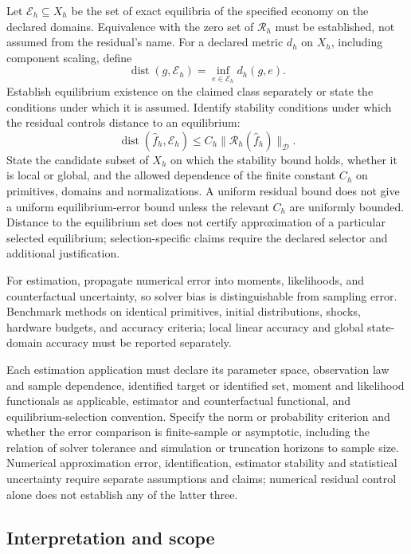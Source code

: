 \documentclass[11pt,a4paper]{article}
\begin{document}
Let $\mathcal E_h\subseteq X_h$ be the set of exact equilibria of the specified economy on the declared domains. Equivalence with the zero set of $\mathcal R_h$ must be established, not assumed from the residual's name. For a declared metric $d_h$ on $X_h$, including component scaling, define
\[
\operatorname{dist}(g,\mathcal E_h)=\inf_{e\in\mathcal E_h}d_h(g,e).
\]
Establish equilibrium existence on the claimed class separately or state the conditions under which it is assumed. Identify stability conditions under which the residual controls distance to an equilibrium:
\[
\operatorname{dist}(\hat f_h,\mathcal E_h)\le C_h\|\mathcal R_h(\hat f_h)\|_{\mathcal D}.
\]
State the candidate subset of $X_h$ on which the stability bound holds, whether it is local or global, and the allowed dependence of the finite constant $C_h$ on primitives, domains and normalizations. A uniform residual bound does not give a uniform equilibrium-error bound unless the relevant $C_h$ are uniformly bounded. Distance to the equilibrium set does not certify approximation of a particular selected equilibrium; selection-specific claims require the declared selector and additional justification.

For estimation, propagate numerical error into moments, likelihoods, and counterfactual uncertainty, so solver bias is distinguishable from sampling error. Benchmark methods on identical primitives, initial distributions, shocks, hardware budgets, and accuracy criteria; local linear accuracy and global state-domain accuracy must be reported separately.

Each estimation application must declare its parameter space, observation law and sample dependence, identified target or identified set, moment and likelihood functionals as applicable, estimator and counterfactual functional, and equilibrium-selection convention. Specify the norm or probability criterion and whether the error comparison is finite-sample or asymptotic, including the relation of solver tolerance and simulation or truncation horizons to sample size. Numerical approximation error, identification, estimator stability and statistical uncertainty require separate assumptions and claims; numerical residual control alone does not establish any of the latter three.

\subsection*{Interpretation and scope}
\end{document}
